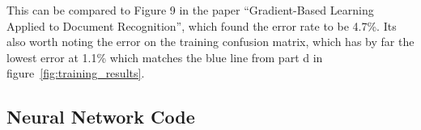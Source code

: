 This can be compared to Figure 9 in the paper ``Gradient-Based Learning Applied to Document Recognition''\cite{lecun1998gradient}, which found the error rate to be 4.7\%. 
Its also worth noting the error on the training confusion matrix, which has by far the lowest error at 1.1\% which matches the blue line from part d in figure~\ref{fig:training_results}.

\newpage
\subsection*{Neural Network Code}






